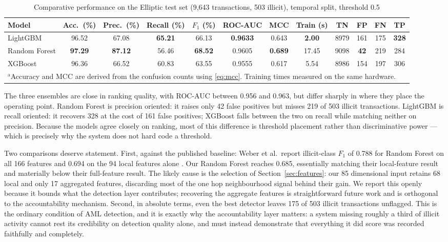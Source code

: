 \documentclass[conference]{IEEEtran}
\begin{document}
\begin{table}[t]
\caption{Comparative performance on the Elliptic test set (9{,}643 transactions, 503 illicit), temporal split, threshold 0.5}
\begin{center}
\setlength{\tabcolsep}{5pt}
\begin{tabular}{|l|c|c|c|c|c|c|c|c|c|c|c|}
\hline
\textbf{Model} & \textbf{Acc.\ (\%)} & \textbf{Prec.\ (\%)} & \textbf{Recall (\%)} &
\textbf{$F_1$ (\%)} & \textbf{ROC-AUC} & \textbf{MCC} & \textbf{Train (s)} &
\textbf{TN} & \textbf{FP} & \textbf{FN} & \textbf{TP}\\
\hline
LightGBM      & 96.52 & 67.08 & \textbf{65.21} & 66.13 & \textbf{0.9633} & 0.643 & \textbf{2.00} & 8979 & 161 & 175 & \textbf{328}\\
\hline
Random Forest & \textbf{97.29} & \textbf{87.12} & 56.46 & \textbf{68.52} & 0.9605 & \textbf{0.689} & 17.45 & 9098 & \textbf{42} & 219 & 284\\
\hline
XGBoost       & 96.36 & 66.52 & 60.83 & 63.55 & 0.9555 & 0.617 & 5.54 & 8986 & 154 & 197 & 306\\
\hline
\multicolumn{12}{l}{\footnotesize $^{\mathrm{a}}$Accuracy and MCC are derived from the confusion counts using \eqref{eq:mcc}. Training times measured on the same hardware.}
\end{tabular}
\end{center}
\label{tab:models}
\end{table}

The three ensembles are close in ranking quality, with ROC-AUC between 0.956 and
0.963, but differ sharply in where they place the operating point. Random Forest
is precision oriented: it raises only 42 false positives but misses 219 of 503
illicit transactions. LightGBM is recall oriented: it recovers 328 at the cost
of 161 false positives; XGBoost falls between the two on recall while matching
neither on precision. Because the models agree closely on ranking, most of this difference is
threshold placement rather than discriminative power --- which is precisely why
the system does not hard code a threshold.

Two comparisons deserve statement. First, against the published baseline: Weber
et al.\ report illicit-class $F_1$ of 0.788 for Random Forest on all 166
features and 0.694 on the 94 local features alone \cite{weber2019aml}. Our
Random Forest reaches 0.685, essentially matching their local-feature result and
materially below their full-feature result. The likely cause is the selection of
Section~\ref{sec:features}: our 85 dimensional input retains 68 local and only
17 aggregated features, discarding most of the one hop neighbourhood signal
behind their gain. We report this openly because it bounds what the detection
layer contributes; recovering the aggregate features is straightforward future
work and is orthogonal to the accountability mechanism. Second, in absolute
terms, even the best detector leaves 175 of 503 illicit transactions unflagged.
This is the ordinary condition of AML detection, and it is exactly why the
accountability layer matters: a system missing roughly a third of illicit
activity cannot rest its credibility on detection quality alone, and must
instead demonstrate that everything it did score was recorded faithfully and
completely.
\end{document}
